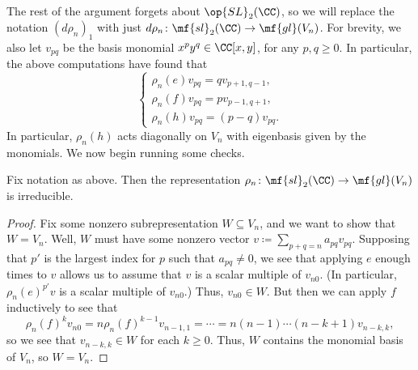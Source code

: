 \documentclass[../notes.tex]{subfiles}
\begin{document}
The rest of the argument forgets about $\op{SL}_2(\CC)$, so we will replace the notation $(d\rho_n)_1$ with just $d\rho_n\colon\mf{sl}_2(\CC)\to\mf{gl}(V_n)$. For brevity, we also let $v_{pq}$ be the basis monomial $x^py^q\in\CC[x,y]$, for any $p,q\ge0$. In particular, the above computations have found that
\begin{equation}
	\begin{cases}
		\rho_n(e)v_{pq}=qv_{p+1,q-1}, \\
		\rho_n(f)v_{pq}=pv_{p-1,q+1}, \\
		\rho_n(h)v_{pq}=(p-q)v_{pq}.
	\end{cases} \label{eq:sl2-poly-action}
\end{equation}
In particular, $\rho_n(h)$ acts diagonally on $V_n$ with eigenbasis given by the monomials. We now begin running some checks.
\begin{lemma} \label{lem:sl2-get-irreps}
	Fix notation as above. Then the representation $\rho_n\colon\mf{sl}_2(\CC)\to\mf{gl}(V_n)$ is irreducible.
\end{lemma}
\begin{proof}
	Fix some nonzero subrepresentation $W\subseteq V_n$, and we want to show that $W=V_n$. Well, $W$ must have some nonzero vector $v\coloneqq\sum_{p+q=n}a_{pq}v_{pq}$. Supposing that $p'$ is the largest index for $p$ such that $a_{pq}\ne0$, we see that applying $e$ enough times to $v$ allows us to assume that $v$ is a scalar multiple of $v_{n0}$. (In particular, $\rho_n(e)^{p'}v$ is a scalar multiple of $v_{n0}$.) Thus, $v_{n0}\in W$. But then we can apply $f$ inductively to see that
	\[\rho_n(f)^kv_{n0}=n\rho_n(f)^{k-1}v_{n-1,1}=\cdots=n(n-1)\cdots(n-k+1)v_{n-k,k},\]
	so we see that $v_{n-k,k}\in W$ for each $k\ge0$. Thus, $W$ contains the monomial basis of $V_n$, so $W=V_n$.
\end{proof}
\end{document}
